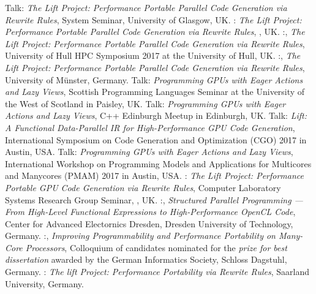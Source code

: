          {Talk: \emph{The Lift Project: Performance Portable Parallel Code Generation via Rewrite Rules},
         \small System Seminar, University of Glasgow, UK.}
         {:
          \emph{The Lift Project: Performance Portable Parallel Code Generation via Rewrite Rules},
         \small {}, UK.}
         {:,
          \emph{The Lift Project: Performance Portable Parallel Code Generation via Rewrite Rules},
         \small University of Hull HPC Symposium 2017 at the University of Hull, UK.}
         {:,
          \emph{The Lift Project: Performance Portable Parallel Code Generation via Rewrite Rules},
         \small University of Münster, Germany.}
         {Talk: \emph{Programming GPUs with Eager Actions and Lazy Views},
         \small Scottish Programming Languages Seminar at the University of the West of Scotland in Paisley, UK.}
         {Talk: \emph{Programming GPUs with Eager Actions and Lazy Views},
         \small C++ Edinburgh Meetup in Edinburgh, UK.}
         {Talk: \emph{Lift: A Functional Data-Parallel IR for High-Performance GPU Code Generation},
          \small International Symposium on Code Generation and Optimization (CGO) 2017 in Austin, USA.}
         {Talk: \emph{Programming GPUs with Eager Actions and Lazy Views},
          \small  International Workshop on Programming Models and Applications for Multicores and Manycores (PMAM) 2017 in Austin, USA.}
         {: \emph{The Lift Project: Performance Portable GPU Code Generation via Rewrite Rules},
         Computer Laboratory Systems Research Group Seminar, , UK.
         }
         {:, \emph{Structured Parallel Programming --- From High-Level Functional Expressions to High-Performance OpenCL Code},
         Center for Advanced Electornics Dresden, Dresden University of Technology, Germany.
         }
         {:, \emph{Improving Programmability and Performance Portability on Many-Core Processors},
         \small Colloquium of candidates nominated for the \emph{prize for best dissertation} awarded by the German Informatics Society, Schloss Dagstuhl, Germany.}
         {: \emph{The lift Project: Performance Portability via Rewrite Rules},
          \small Saarland University, Germany.}
